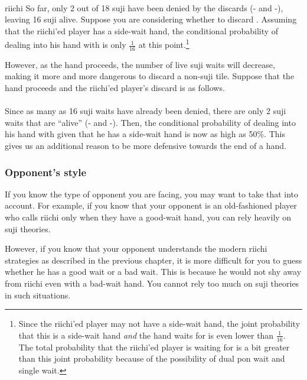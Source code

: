 {{\bp
\bei\fa{}\\
\hspace{53pt}\footnotesize{riichi}
\ep
So far, only 2 out of 18 {\jap suji} have been denied by the discards ({\LARGE{}-} and {\LARGE{}-}), leaving 16 {\jap suji} alive. Suppose you are considering whether to discard {\LARGE{}}. Assuming that the riichi'ed player has a side-wait hand, the conditional probability of dealing into his hand with {\LARGE{}} is only $\frac{1}{16}$ at this point.\footnote{Since the riichi'ed player may not have a side-wait hand, the joint probability that this is a side-wait hand \emph{and} the hand waits for  is even lower than $\frac{1}{16}$. The total probability that the riichi'ed player is waiting for  is a bit greater than this joint probability because of the possibility of dual {\jap pon} wait and single wait.}

\bigskip
However, as the hand proceeds, the number of live {\jap suji} waits will decrease, making it more and more dangerous to discard a non-{\jap suji} tile. Suppose that the hand proceeds and the riichi'ed player's discard is as follows. 
\bp
\bei\fa{}\\
\vspace{-10pt}
\hspace{-5pt}\\
\vspace{-10pt}
\hspace{-95pt}
\ep
Since as many as 16 {\jap suji} waits have already been denied, there are only 2 {\jap suji} waits that are ``alive'' ({\LARGE{}-} and {\LARGE{}-}). Then, the conditional probability of dealing into his hand with {\LARGE{}} given that he has a side-wait hand is now as high as 50\%. This gives us an additional reason to be more defensive towards the end of a hand. 

\subsubsection*{Opponent's style}
If you know the type of opponent you are facing, you may want to take that into account. For example, if you know that your opponent is an old-fashioned player who calls riichi only when they have a good-wait hand, you can rely heavily on {\jap suji} theories. 

\bigskip
However, if you know that your opponent understands the modern riichi strategies as described in the previous chapter, it is more difficult for you to guess whether he has a good wait or a bad wait. This is because he would not shy away from riichi even with a bad-wait hand. You cannot rely too much on {\jap suji} theories in such situations. 

}}
